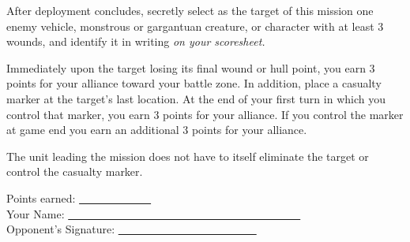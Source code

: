 \documentclass{40k}
\begin{document}
\begin{landscape}
{{\hspace{1em} After deployment concludes, secretly select as the target
of this mission one enemy vehicle, monstrous or gargantuan creature,
or character with at least 3 wounds, and identify it in writing
\emph{on your scoresheet.}

\hspace{1em} Immediately upon the target losing its final wound or
hull point, you earn 3 points for your alliance toward your battle
zone.  In addition, place a casualty marker at the target's last
location.  At the end of your first turn in which you control that
marker, you earn 3 points for your alliance.  If you control the
marker at game end you earn an additional 3 points for your alliance.

\hspace{1em} The unit leading the mission does not have to itself
eliminate the target or control the casualty marker.

\small
\bigskip%
\vspace{-2pt}%
\begin{minipage}{1.0\linewidth}\centering
Points earned: \underline{~~~~~~~~~~~~~}\\
\smallskip%
Your Name: \underline{~~~~~~~~~~~~~~~~~~~~~~~~~~~~~~~~~~~~~~~~~~}\\
\smallskip%
Opponent's Signature: \underline{~~~~~~~~~~~~~~~~~~~~~~~~~}
\end{minipage}
}%
\drawscorecard
}

\newcommand{\covertd}{%
\renewcommand{\scorematrix}{%
\centerline{\Large\fontfamily{ptm}\selectfont Search}
\bigskip\scriptsize

After deployment concludes, place 3 search markers in separate terrain
pieces outside your deployment zone.

\hspace{1em} At the end of your first turn in which you control any
search marker, you earn 4 points for your alliance toward your battle
zone.  In addition, randomly select one of the two other search
markers.  At the end of your first turn in which you control that
marker you earn 5 points for your alliance toward your battle zone.

\hspace{1em} If you control multiple search markers at the end of the
first turn in which you do so, you earn 9 points for your alliance and
do not roll to select another.

\small
\bigskip%
\bigskip%
\bigskip%
\bigskip%
\smallskip%
\begin{minipage}{1.0\linewidth}\centering
Points earned: \underline{~~~~~~~~~~~~~}\\
\bigskip%
Your Name: \underline{~~~~~~~~~~~~~~~~~~~~~~~~~~~~~~~~~~~~~~~~~~}\\
\bigskip%
Opponent's Signature: \underline{~~~~~~~~~~~~~~~~~~~~~~~~~}
\end{minipage}
}%
\drawscorecard
}

\noindent%
\covertd%
%
%
\hfill%
%
%
\covertd%
%
%
\hfill%
%
%
\covertd

\vfill

\covertd
%
\hfill%
%
\covertd
%
\hfill%
%
\covertd

\end{landscape}
\clearpage
\restorebackground
\end{document}
